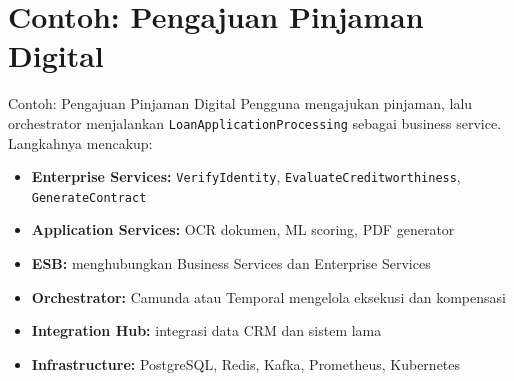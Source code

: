 \documentclass[aspectratio=169, table]{beamer}
\begin{document}
\section{Contoh: Pengajuan Pinjaman Digital}
\begin{frame}[fragile]{Contoh: Pengajuan Pinjaman Digital}
	Pengguna mengajukan pinjaman, lalu orchestrator menjalankan \texttt{LoanApplicationProcessing} sebagai business service. Langkahnya mencakup:
	\begin{itemize}
		\item \textbf{Enterprise Services:} \texttt{VerifyIdentity}, \texttt{EvaluateCreditworthiness}, \texttt{GenerateContract}
		\item \textbf{Application Services:} OCR dokumen, ML scoring, PDF generator
		\item \textbf{ESB:} menghubungkan Business Services dan Enterprise Services
		\item \textbf{Orchestrator:} Camunda atau Temporal mengelola eksekusi dan kompensasi
		\item \textbf{Integration Hub:} integrasi data CRM dan sistem lama
		\item \textbf{Infrastructure:} PostgreSQL, Redis, Kafka, Prometheus, Kubernetes
	\end{itemize}
\end{frame}
\end{document}
